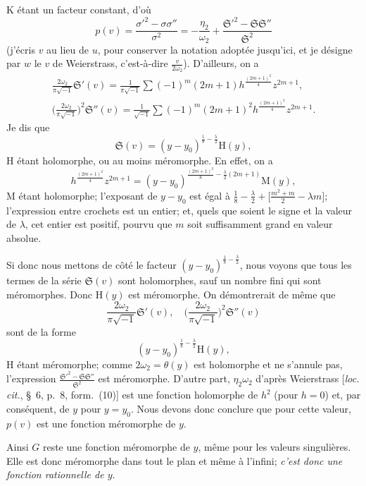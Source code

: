 \documentclass{article}
\begin{document}
$\mathrm{K}$ étant un facteur constant, d'où
\[
p(v) = \frac{\sigma'^{2} - \sigma\sigma''}{\sigma^{2}} = - \frac{\eta_{2}}{\omega_{2}} + \frac{\mathfrak{S}'^{2} - \mathfrak{S}\mathfrak{S}''}{\mathfrak{S}^{2}}
\]
(j'écris $v$ au lieu de $u$, pour conserver la notation adoptée jusqu'ici, et je désigne par $w$ le $v$ de Weierstrass, c'est-à-dire $\frac{v}{2\omega_{2}}$). D'ailleurs, on a
\[
\begin{gathered}
\frac{2\omega_{2}}{\pi\sqrt{-1}} \mathfrak{S}'(v) = \frac{1}{\pi\sqrt{-1}} \sum (-1)^{m} (2m+1) h^{\frac{(2m+1)^{2}}{4}} z^{2m+1}, \\
\biggl( \frac{2\omega_{2}}{\pi\sqrt{-1}} \biggr)^{2} \mathfrak{S}''(v) = \frac{1}{\sqrt{-1}} \sum (-1)^{m} (2m+1)^{2} h^{\frac{(2m+1)^{2}}{4}} z^{2m+1}.
\end{gathered}
\]
Je dis que
\[
\mathfrak{S}(v) = (y - y_{0})^{\frac{1}{8} - \frac{\lambda}{2}} \mathrm{H}(y),
\]
$\mathrm{H}$ étant holomorphe, ou au moins méromorphe. En effet, on a
\[
h^{\frac{(2m+1)^{2}}{4}} z^{2m+1} = (y - y_{0})^{\frac{(2m+1)^{2}}{8} - \frac{\lambda}{2}(2m+1)} \mathrm{M}(y),
\]
$\mathrm{M}$ étant holomorphe; l'exposant de $y - y_{0}$ est égal à $\frac{1}{8} - \frac{\lambda}{2} + \bigl[ \frac{m^{2} + m}{2} - \lambda m \bigr]$; l'expression entre crochets est un entier; et, quels que soient le signe et la valeur de $\lambda$, cet entier est positif, pourvu que $m$ soit suffisamment grand en valeur absolue.

Si donc nous mettons de côté le facteur $(y - y_{0})^{\frac{1}{8} - \frac{\lambda}{2}}$, nous voyons que tous les termes de la série $\mathfrak{S}(v)$ sont holomorphes, sauf un nombre fini qui sont méromorphes. Donc $\mathrm{H}(y)$ est méromorphe. On démontrerait de même que
\[
\frac{2\omega_{2}}{\pi\sqrt{-1}} \mathfrak{S}'(v), \quad \biggl( \frac{2\omega_{2}}{\pi\sqrt{-1}} \biggr)^{2} \mathfrak{S}''(v)
\]
sont de la forme
\[
(y - y_{0})^{\frac{1}{8} - \frac{\lambda}{2}} \mathrm{H}(y),
\]
$\mathrm{H}$ étant méromorphe; comme $2\omega_{2} = \theta(y)$ est holomorphe et ne s'annule pas, l'expression $\frac{\mathfrak{S}'^{2} - \mathfrak{S}\mathfrak{S}''}{\mathfrak{S}^{2}}$ est méromorphe. D'autre part, $\eta_{2}\omega_{2}$ d'après Weierstrass [\emph{loc. cit.}, §~6, p.~8, form.~(10)] est une fonction holomorphe de $h^{2}$ (pour $h = 0$) et, par conséquent, de $y$ pour $y = y_{0}$. Nous devons donc conclure que pour cette valeur, $p(v)$ est une fonction méromorphe de $y$.

Ainsi $G$ reste une fonction méromorphe de $y$, même pour les valeurs singulières. Elle est donc méromorphe dans tout le plan et même à l'infini; \emph{c'est donc une fonction rationnelle de $y$}.
\end{document}
